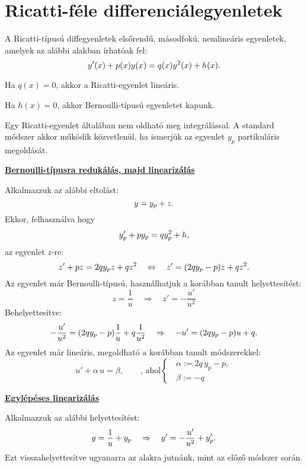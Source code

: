 \clearpage
\section{Ricatti-féle differenciálegyenletek}

\begin{definition}
  A Ricatti-típusú diffegyenletek elsőrendű, másodfokú, nemlineáris egyenletek,
  amelyek az alábbi alakban írhatóak fel:
  $$
    y'(x) + p(x)y(x) = q(x)y^2(x) + h(x)
    \text.
  $$
\end{definition}

\begin{note}
  Ha $q(x) = 0$, akkor a Ricatti-egyenlet lineáris.

  Ha $h(x) = 0$, akkor Bernoulli-típusú egyenletet kapunk.
\end{note}

\begin{blueBox}
  Egy Ricatti-egyenlet általában nem oldható meg integrálással. A standard
  módszer akkor működik közvetlenül, ha ismerjük az egyenlet $y_p$ partikuláris
  megoldását.

  \underline{\textbf{Bernoulli-típusra redukálás, majd linearizálás}}

  Alkalmazzuk az alábbi eltolást:
  $$
    y = y_p + z
    \text.
  $$
  Ekkor, felhasználva hogy
  $$
    y_p' + p y_p = q y_p^2 + h
    \text,
  $$
  az egyenlet $z$-re:
  $$
    z' + p z = 2q y_p z + q z^2
    \quad\Leftrightarrow\quad
    z' = (2qy_p - p) z + q z^2
    \text.
  $$
  Az egyenlet már Bernoulli-típusú, használhatjuk a korábban tanult
  helyettesítést:
  $$
    z = \frac{1}{u}
    \quad\Rightarrow\quad
    z' = -\frac{u'}{u^2}
  $$
  Behelyettesítve:
  $$
    -\frac{u'}{u^2} = (2qy_p - p)\frac{1}{u} + q\frac{1}{u^2}
    \quad\Rightarrow\quad
    -u' = (2qy_p - p)u + q
    \text.
  $$
  Az egyenlet már lineáris, megoldható a korábban tanult módszerekkel:
  $$
    u' + \alpha\,u = \beta,
    \qquad
    \text{, ahol}
    \begin{cases}
      \;\;\alpha := 2q\,y_p - p,
      \\
      \;\;\beta := -q
    \end{cases}
  $$

  \underline{\textbf{Egylépéses linearizálás}}

  Alkalmazzuk az alábbi helyettesítést:
  $$
    y = \frac{1}{u} + y_p
    \quad\Rightarrow\quad
    y' = -\frac{u'}{u^2} + y_p'
    \text.
  $$
  Ezt visszahelyettesítve ugyanarra az alakra jutnánk, mint az előző módszer
  során.
\end{blueBox}

